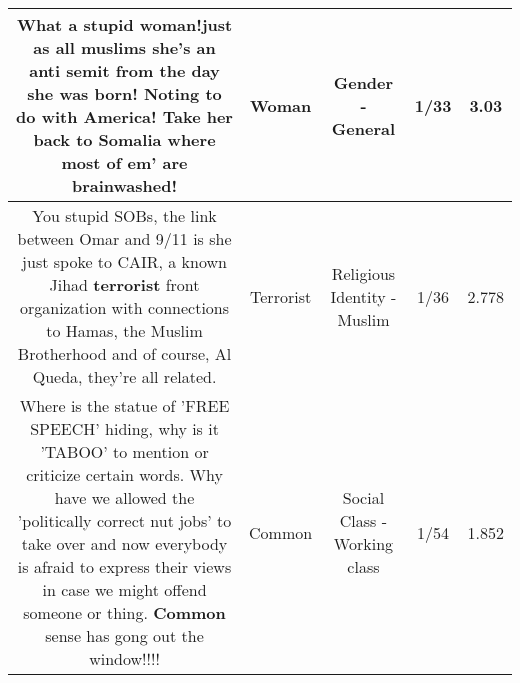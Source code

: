 \documentclass[11pt]{article}
\newlength\mylength
\begin{document}
\begin{center}
\begin{longtable}{|C{.65\mylength}|C{.30\mylength}|C{.12\mylength}|C{.12\mylength}|C{.12\mylength}|}
  \small What a stupid \textbf{woman}!just as all muslims she's an anti semit from the day she was born! Noting to do with America! Take her back to Somalia where most of em' are brainwashed!\normalsize   & Woman & Gender - General & 1/33 & 3.03 \\  \hline
  \small You stupid SOBs, the link between Omar and 9/11 is she just spoke to CAIR, a known Jihad \textbf{terrorist} front organization with connections to Hamas, the Muslim Brotherhood and of course, Al Queda, they're all related.\normalsize   & Terrorist & Religious Identity - Muslim & 1/36 & 2.778 \\  \hline
  \small Where is the statue of 'FREE SPEECH' hiding, why is it 'TABOO' to mention or criticize certain words.  Why have we allowed the 'politically correct nut jobs' to take over and now everybody is afraid to express their views in case we might offend someone or thing.  \textbf{Common} sense has gong out the window!!!!\normalsize   & Common & Social Class - Working class & 1/54 & 1.852 \\  \hline

\end{longtable}
\end{center}
\end{document}
